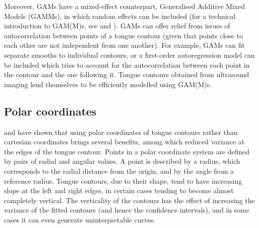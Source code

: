 \documentclass[
  11pt,
]{article}
\begin{document}
Moreover, GAMs have a mixed-effect counterpart, Generalised Additive
Mixed Models (GAMMs), in which random effects can be included (for a
technical introduction to GAM(M)s, see \citealt{zuur2012} and
\citealt{wood2017}). GAMs can offer relief from issues of
autocorrelation between points of a tongue contour (given that points
close to each other are not independent from one another). For example,
GAMs can fit separate smooths to individual contours, or a first-order
autoregression model can be included which tries to account for the
autocorrelation between each point in the contour and the one following
it. Tongue contours obtained from ultrasound imaging lend themselves to
be efficiently modelled using GAM(M)s.

\hypertarget{polar-coordinates}{%
\subsection{Polar coordinates}\label{polar-coordinates}}

\citet{mielke2015} and \citet{heyne2015a, heyne2015} have shown that
using polar coordinates of tongue contours rather than cartesian
coordinates brings several benefits, among which reduced variance at the
edges of the tongue contour. Points in a polar coordinate system are
defined by pairs of radial and angular values. A point is described by a
radius, which corresponds to the radial distance from the origin, and by
the angle from a reference radius. Tongue contours, due to their shape,
tend to have increasing slope at the left and right edges, in certain
cases tending to become almost completely vertical. The verticality of
the contours has the effect of increasing the variance of the fitted
contours (and hence the confidence intervals), and in some cases it can
even generate uninterpretable curves.
\end{document}
